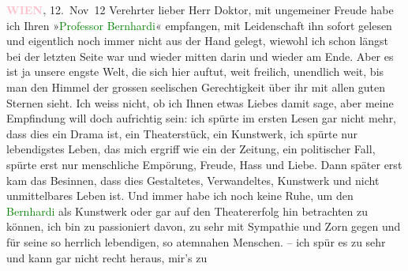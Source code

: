 \pstart
           \raggedleft{}\textcolor{gray}{\textbf{\textcolor{pink}{WIEN}\ledrightnote{\textcolor{pink}{Wien}},}}{ }12. Nov 12\pend
           {\vspace{1\baselineskip}}
\pstart{}Verehrter lieber Herr Doktor,\pend\vspace{0.5em}
\pstart
            mit ungemeiner Freude habe ich Ihren »\textcolor{green}{Professor
                  Bernhardi}\ledrightnote{\textcolor{green}{Professor Bernhardi. Komödie in fünf Akten}}« empfangen, mit Leidenschaft ihn sofort gelesen und eigentlich noch
               immer nicht aus der Hand gelegt, wiewohl ich schon längst bei der letzten Seite war
               und wieder mitten darin und wieder am Ende. Aber es ist ja unsere engste Welt, die
               sich hier auftut, weit freilich, unendlich weit, bis man den Himmel der grossen
               seelischen Gerechtigkeit über ihr mit allen guten Sternen sieht. Ich weiss nicht, ob
               ich Ihnen etwas Liebes damit sage, aber meine Empfindung will doch aufrichtig sein:
                  {\pb}ich spürte im ersten Lesen gar nicht
               mehr, dass dies ein Drama ist, ein Theaterstück, ein Kunstwerk, ich spürte nur
               lebendigstes Leben, das mich ergriff wie ein \label{K_L03639-1v}\label{K_L03639-1} der Zeitung, ein politischer Fall, spürte erst nur
               menschliche Empörung, Freude, Hass und Liebe. Dann später erst kam das Besinnen, dass
               dies Gestaltetes, Verwandeltes, Kunstwerk und nicht unmittelbares Leben ist. Und  immer habe ich noch keine Ruhe, um den \textcolor{green}{Bernhardi}\ledrightnote{\textcolor{green}{Professor Bernhardi. Komödie in fünf Akten}} als Kunstwerk oder gar auf den
               Theatererfolg hin betrachten zu können, ich bin zu passioniert davon, zu sehr mit
               Sympathie und Zorn gegen und für seine so herrlich lebendigen, so atemnahen Menschen.
                  \label{K_L03639-2v}\label{K_L03639-2} – ich spür es zu sehr und {\pb}kann gar nicht recht heraus, mir's zu
